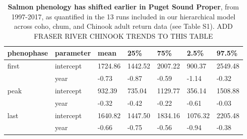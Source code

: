 \documentclass{article}
\begin{document}
\begin{table}[ht]
\centering
\caption{\textbf{Salmon phenology has shifted earlier in Puget Sound Proper}, from 1997-2017, as quantified in the 13 runs included in our hierarchical model across coho, chum, and Chinook adult return data (see Table S1). ADD FRASER RIVER CHINOOK TRENDS TO THIS TABLE} 
\label{tab:salmtren}
\begingroup\footnotesize
\begin{tabular}{|p{}p{}p{}p{}p{}p{}p{}|}
  \hline
phenophase & parameter & mean & 25\% & 75\% & 2.5\% & 97.5\% \\ 
  \hline
first & intercept & 1724.86 & 1442.52 & 2007.22 &  900.37 & 2549.48 \\ 
   & year & -0.73 & -0.87 & -0.59 & -1.14 & -0.32 \\ 
   \hline
peak & intercept &  932.39 &  735.04 & 1129.77 &  356.14 & 1508.88 \\ 
   & year & -0.32 & -0.42 & -0.22 & -0.61 & -0.03 \\ 
   \hline
last & intercept & 1640.82 & 1447.50 & 1834.16 & 1076.32 & 2205.48 \\ 
   & year & -0.66 & -0.75 & -0.56 & -0.94 & -0.38 \\ 
   \hline
\end{tabular}
\endgroup
\end{table}
\end{document}
